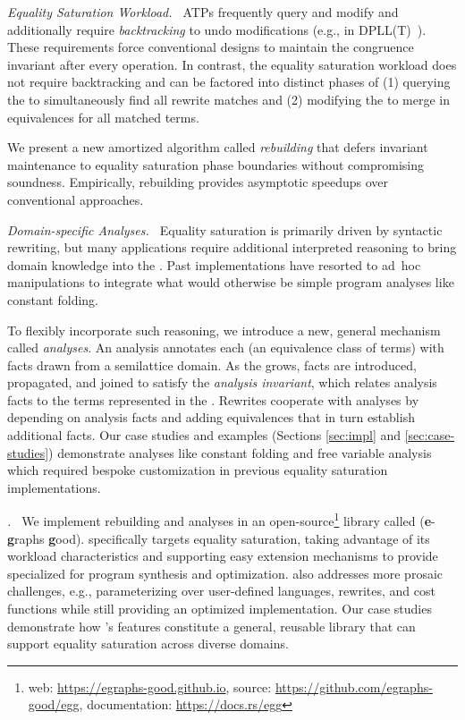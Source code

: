 \textit{Equality Saturation Workload. $\,$}
%
ATPs frequently query and modify \egraphs and
  additionally require \textit{backtracking} to
  undo modifications (e.g., in  DPLL(T)~\cite{dpll}).
These requirements force conventional \egraph designs
  to maintain the congruence invariant after every operation.
In contrast,
  the equality saturation workload does not require backtracking and
  can be factored into distinct phases of
  (1) querying the \egraph to simultaneously find all rewrite matches and
  (2) modifying the \egraph to merge in equivalences for all matched terms.

We present a new amortized algorithm
  called \textit{rebuilding} that defers \egraph invariant maintenance
  to equality saturation phase boundaries without compromising soundness.
Empirically, rebuilding provides asymptotic speedups
  over conventional approaches.

\textit{Domain-specific Analyses. $\,$}
%
Equality saturation is primarily driven by syntactic rewriting,
  but many applications require additional interpreted reasoning
  to bring domain knowledge into the \egraph.
Past implementations have resorted to
  ad~hoc \egraph manipulations
  to integrate what would otherwise be
  simple program analyses like constant folding.

To flexibly incorporate such reasoning,
  we introduce a new, general mechanism called \textit{\eclass analyses}.
An \eclass analysis annotates each \eclass
  (an equivalence class of terms)
  with facts drawn from a semilattice domain.
As the \egraph grows,
  facts are introduced, propagated, and joined
  to satisfy the \textit{\eclass analysis invariant},
  which relates analysis facts to the terms represented in the \egraph.
Rewrites cooperate with \eclass analyses by
  depending on analysis facts and
  adding equivalences that in turn
  establish additional facts.
Our case studies and examples
  (Sections \ref{sec:impl} and \ref{sec:case-studies})
  demonstrate \eclass analyses like
  constant folding and free variable analysis
  which required bespoke customization in
  previous equality saturation implementations.

\textit{\Egg. $\,$}
%
We implement rebuilding and \eclass analyses in
  an open-source\footnote{
    web: \url{https://egraphs-good.github.io},
    source: \url{https://github.com/egraphs-good/egg},
    documentation: \url{https://docs.rs/egg}
  }
  library called \egg (\textbf{e}-\textbf{g}raphs \textbf{g}ood).
\Egg specifically targets equality saturation,
  taking advantage of its workload characteristics and
  supporting easy extension mechanisms to
  provide \egraphs specialized for
  program synthesis and optimization.
\Egg also addresses more prosaic challenges,
  e.g., parameterizing over user-defined
  languages, rewrites, and cost functions
  while still providing an optimized implementation.
Our case studies demonstrate how \egg's features
  constitute a general, reusable \egraph library that can
  support equality saturation across diverse domains.


